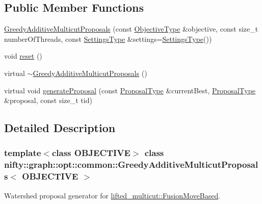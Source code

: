\subsection*{Public Member Functions}
\begin{DoxyCompactItemize}
\item 
\hyperlink{classnifty_1_1graph_1_1opt_1_1common_1_1GreedyAdditiveMulticutProposals_a13d741c3e55df3a21430869ca4546627}{Greedy\+Additive\+Multicut\+Proposals} (const \hyperlink{classnifty_1_1graph_1_1opt_1_1common_1_1GreedyAdditiveMulticutProposals_a3e3e6166f8860e862acf00a9d134af54}{Objective\+Type} \&objective, const size\+\_\+t number\+Of\+Threads, const \hyperlink{structnifty_1_1graph_1_1opt_1_1common_1_1GreedyAdditiveMulticutProposals_1_1SettingsType}{Settings\+Type} \&settings=\hyperlink{structnifty_1_1graph_1_1opt_1_1common_1_1GreedyAdditiveMulticutProposals_1_1SettingsType}{Settings\+Type}())
\item 
void \hyperlink{classnifty_1_1graph_1_1opt_1_1common_1_1GreedyAdditiveMulticutProposals_a4b45c7d68ca492662bdf8585b99b6ec8}{reset} ()
\item 
virtual \hyperlink{classnifty_1_1graph_1_1opt_1_1common_1_1GreedyAdditiveMulticutProposals_ab6333904198780a44ac75fc37a6ae49a}{$\sim$\+Greedy\+Additive\+Multicut\+Proposals} ()
\item 
virtual void \hyperlink{classnifty_1_1graph_1_1opt_1_1common_1_1GreedyAdditiveMulticutProposals_a72bb3fb26fe3d32cf8fa0f6fd2a05010}{generate\+Proposal} (const \hyperlink{classnifty_1_1graph_1_1opt_1_1common_1_1GreedyAdditiveMulticutProposals_a1a51f12b52812e4a7942bcfaa2d35d05}{Proposal\+Type} \&current\+Best, \hyperlink{classnifty_1_1graph_1_1opt_1_1common_1_1GreedyAdditiveMulticutProposals_a1a51f12b52812e4a7942bcfaa2d35d05}{Proposal\+Type} \&proposal, const size\+\_\+t tid)
\end{DoxyCompactItemize}


\subsection{Detailed Description}
\subsubsection*{template$<$class O\+B\+J\+E\+C\+T\+I\+VE$>$\newline
class nifty\+::graph\+::opt\+::common\+::\+Greedy\+Additive\+Multicut\+Proposals$<$ O\+B\+J\+E\+C\+T\+I\+V\+E $>$}

Watershed proposal generator for \hyperlink{classnifty_1_1graph_1_1opt_1_1lifted__multicut_1_1FusionMoveBased}{lifted\+\_\+multicut\+::\+Fusion\+Move\+Based}. 


